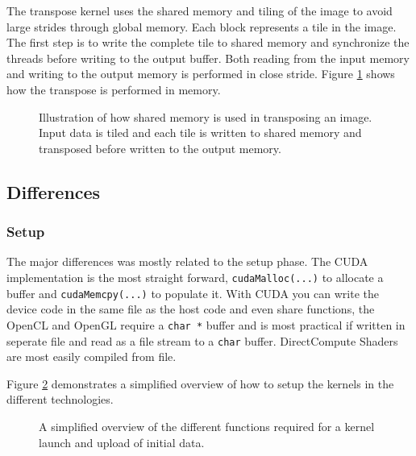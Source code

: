 The transpose kernel uses the shared memory and tiling of the image to avoid large strides through global memory. Each block represents a tile in the image. The first step is to write the complete tile to shared memory and synchronize the threads before writing to the output buffer. Both reading from the input memory and writing to the output memory is performed in close stride. Figure \ref{fig:transpose-memory} shows how the transpose is performed in memory.

\begin{figure}[H]
	\centering
	
	\caption{Illustration of how shared memory is used in transposing an image. Input data is tiled and each tile is written to shared memory and transposed before written to the output memory. }
	\label{fig:transpose-memory}
\end{figure}

\subsection{Differences}

\subsubsection{Setup}

The major differences was mostly related to the setup phase. The CUDA implementation is the most straight forward, \texttt{cudaMalloc(...)} to allocate a buffer and \texttt{cudaMemcpy(...)} to populate it. With CUDA you can write the device code in the same file as the host code and even share functions, the OpenCL and OpenGL require a \texttt{char *} buffer and is most practical if written in seperate file and read as a file stream to a \texttt{char} buffer. DirectCompute Shaders are most easily compiled from file.

Figure \ref{fig:code:setup} demonstrates a simplified overview of how to setup the kernels in the different technologies.
\begin{figure}
	\centering
	\def \setupWidth {\textwidth / 2 - 20pt}	
	\hfill
	\newline
	\hfill
	\caption{A simplified overview of the different functions required for a kernel launch and upload of initial data. }		
	\label{fig:code:setup}
\end{figure}

